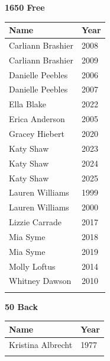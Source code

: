 \noindent\begin{minipage}[t]{0.48\textwidth}
\centering
\textbf{\textcolor{teamprimary}{1650 Free}}\par
\vspace{0.5em}
\centering
\small
\renewcommand{\arraystretch}{1.0}
\setlength{\tabcolsep}{4pt}
\begin{tabular}{@{}p{3.0cm}p{1.0cm}@{}}
\toprule
\textbf{Name} & \textbf{Year} \\
\midrule
Carliann Brashier & 2008 \\
Carliann Brashier & 2009 \\
Danielle Peebles & 2006 \\
Danielle Peebles & 2007 \\
Ella Blake & 2022 \\
Erica Anderson & 2005 \\
Gracey Hiebert & 2020 \\
Katy Shaw & 2023 \\
Katy Shaw & 2024 \\
Katy Shaw & 2025 \\
Lauren Williams & 1999 \\
Lauren Williams & 2000 \\
Lizzie Carrade & 2017 \\
Mia Syme & 2018 \\
Mia Syme & 2019 \\
Molly Loftus & 2014 \\
Whitney Dawson & 2010 \\
\bottomrule
\vspace{0.5em}
\end{tabular}
\end{minipage}
\hfill
\begin{minipage}[t]{0.48\textwidth}
\centering
\textbf{\textcolor{teamprimary}{50 Back}}\par
\vspace{0.5em}
\centering
\small
\renewcommand{\arraystretch}{1.0}
\setlength{\tabcolsep}{4pt}
\begin{tabular}{@{}p{3.0cm}p{1.0cm}@{}}
\toprule
\textbf{Name} & \textbf{Year} \\
\midrule
Kristina Albrecht & 1977 \\
\bottomrule
\vspace{0.5em}
\end{tabular}
\end{minipage}
\vspace{1.2em}
